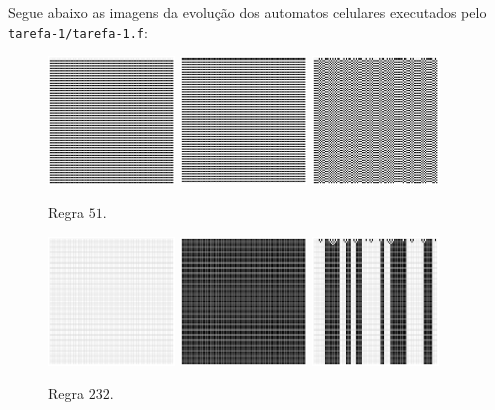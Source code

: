 \documentclass[a4paper, 11pt]{tufte-handout}
\begin{document}
Segue abaixo as imagens da evolução dos automatos celulares executados pelo \verb|tarefa-1/tarefa-1.f|:

\begin{figure}[h]
  \centering
  \includegraphics[width=0.3\textwidth]{tarefa-1/rule-51-0.png}
  \includegraphics[width=0.3\textwidth]{tarefa-1/rule-51-1.png}
  \includegraphics[width=0.3\textwidth]{tarefa-1/rule-51-2.png}
  \caption{Regra $51$.}
\end{figure}
\begin{figure}[h]
  \centering
  \includegraphics[width=0.3\textwidth]{tarefa-1/rule-232-0.png}
  \includegraphics[width=0.3\textwidth]{tarefa-1/rule-232-1.png}
  \includegraphics[width=0.3\textwidth]{tarefa-1/rule-232-2.png}
  \caption{Regra $232$.}
\end{figure}
\end{document}
